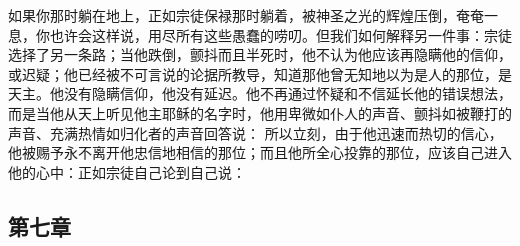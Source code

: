 如果你那时躺在地上，正如宗徒保禄那时躺着，被神圣之光的辉煌压倒，奄奄一息，你也许会这样说，用尽所有这些愚蠢的唠叨。但我们如何解释另一件事：宗徒选择了另一条路；当他跌倒，颤抖而且半死时，他不认为他应该再隐瞒他的信仰，或迟疑；他已经被不可言说的论据所教导，知道那他曾无知地以为是人的那位，是天主。他没有隐瞒信仰，他没有延迟。他不再通过怀疑和不信延长他的错误想法，而是当他从天上听见他主耶稣的名字时，他用卑微如仆人的声音、颤抖如被鞭打的声音、充满热情如归化者的声音回答说： 所以立刻，由于他迅速而热切的信心，他被赐予永不离开他忠信地相信的那位；而且他所全心投靠的那位，应该自己进入他的心中：正如宗徒自己论到自己说：\par


\subsection{第七章}

\par

